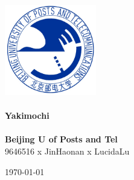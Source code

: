 \documentclass[12pt,a4paper]{article}
\begin{document}
\begin{titlepage}
\begin{center}
\vspace*{0.5cm}
\includegraphics[width=0.3\textwidth]{logo.jpg} \\ [2cm]

\HRule \\ [1cm]
\textbf{\Huge{Yakimochi}} \\ [0.5cm]
\HRule \\ [4cm]

\textbf{\Huge{Beijing U of Posts and Tel}} \\ [1cm]
\LARGE{9646516 x JinHaonan x LucidaLu}

\vfill
\Large{\today}
\end{center}
\clearpage

\tableofcontents
\pagestyle{empty}
\clearpage
\end{titlepage}


\end{document}
